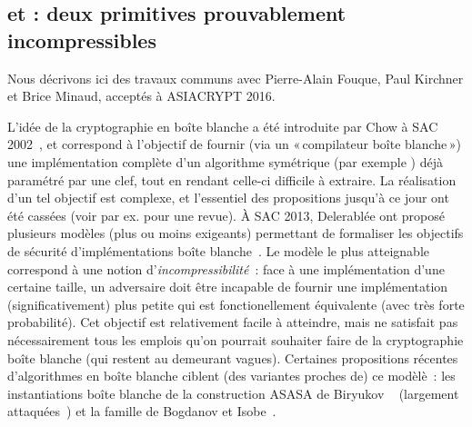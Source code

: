 \subsection{\pc et \cdb : deux primitives prouvablement incompressibles \cite{puppycipher}}

Nous décrivons ici des travaux communs avec Pierre-Alain Fouque, Paul Kirchner et Brice Minaud, acceptés à ASIACRYPT 2016.

\medskip

L'idée de la cryptographie en boîte blanche a été introduite par Chow \etal à SAC 2002~\cite{DBLP:conf/sacrypt/ChowEJO02},
et correspond à l'objectif de fournir (via un «\,compilateur boîte blanche\,») une implémentation complète d'un algorithme symétrique (par exemple \aes) déjà paramétré par
une clef, tout en rendant celle-ci difficile à extraire. La réalisation d'un tel objectif est complexe, et l'essentiel des propositions
jusqu'à ce jour ont été cassées (voir par ex. \cite{HenriWB} pour une revue).
À SAC 2013, Delerablée \etal ont proposé plusieurs modèles (plus ou moins exigeants) permettant de formaliser les objectifs de sécurité d'implémentations boîte blanche~\cite{DBLP:conf/sacrypt/DelerableeLPR13}.
Le modèle le plus atteignable correspond à une notion d'\emph{incompressibilité}~: face à une implémentation d'une certaine taille, un adversaire doit être incapable de fournir une implémentation
(significativement) plus petite qui est fonctionellement équivalente (avec très forte probabilité). Cet objectif est relativement facile à atteindre, mais ne satisfait pas nécessairement
tous les emplois qu'on pourrait souhaiter faire de la cryptographie boîte blanche (qui restent au demeurant vagues). Certaines propositions récentes d'algorithmes en boîte blanche ciblent
(des variantes proches de) ce modèlè~: les instantiations boîte blanche de la construction ASASA de Biryukov \etal~\cite{DBLP:conf/asiacrypt/BiryukovBK14}
(largement attaquées~\cite{DBLP:journals/iacr/DinurDKL15,DBLP:conf/asiacrypt/MinaudDFK15}) et la famille \spacehard de Bogdanov et Isobe~\cite{DBLP:conf/ccs/BogdanovI15}.

